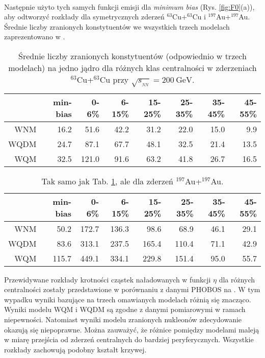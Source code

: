 \documentclass[a4paper,12pt]{article}
\begin{document}
\paragraph{}
Następnie użyto tych samych funkcji emisji dla \textit{minimum bias} (Rys. \ref{fig:F0}(a)), aby odtworzyć rozkłady dla symetrycznych zderzeń $^{63}$Cu+$^{63}$Cu i $^{197}$Au+$^{197}$Au. Średnie liczby zranionych konstytuentów we wszystkich trzech modelach zaprezentowano w .

\begin{table}[H]\centering
\begin{tabular}{|r|r|r|r|r|r|r|r|} \hline
 & min-bias & 0-6\% & 6-15\% & 15-25\% & 25-35\% & 35-45\% & 45-55\% \\ \hline
WNM  & 16.2 & 51.6 & 42.2 & 31.2 & 22.0 & 15.0 & 9.9 \\ \hline
WQDM & 24.7 & 87.1 & 67.7 & 48.1 & 32.5 & 21.4 & 13.5 \\ \hline
WQM  & 32.5 & 121.0 & 91.6 & 63.2 & 41.8 & 26.7 & 16.5 \\ \hline
\end{tabular}
\caption{Średnie liczby zranionych konstytuentów (odpowiednio w trzech modelach) na jedno jądro dla różnych klas centralności w zderzeniach $^{63}$Cu+$^{63}$Cu przy $\sqrt{s_{_{NN}}} = 200~\text{GeV}$.}\label{table:Cu-Cu}
\end{table}
\begin{table}[H]\centering
\begin{tabular}{|r|r|r|r|r|r|r|r|} \hline
 & min-bias & 0-6\% & 6-15\% & 15-25\% & 25-35\% & 35-45\% & 45-55\% \\ \hline
WNM  & 50.2 & 172.7 & 136.3 & 98.6 & 68.9 & 46.1 & 29.1 \\ \hline
WQDM & 83.6 & 313.1 & 237.5 & 165.4 & 110.4 & 71.1 & 42.9 \\ \hline
WQM  & 115.7 & 449.1 & 334.1 & 229.8 & 151.4 & 95.0 & 55.7 \\ \hline
\end{tabular}
\caption{Tak samo jak Tab. \ref{table:Cu-Cu}, ale dla zderzeń $^{197}$Au+$^{197}$Au.}\label{table:Au-Au}
\end{table}

Przewidywane rozkłady krotności cząstek naładowanych w funkcji $\eta$ dla różnych centralności zostały przedstawione w porównaniu z danymi PHOBOS \cite{Alver:2007aa, Back:2002wb} na . W tym wypadku wyniki bazujące na trzech omawianych modelach różnią się znacząco. Wyniki modelu WQM i WQDM są zgodne z danymi pomiarowymi w ramach niepewności. Natomiast wyniki modelu zranionych nukleonów zdecydowanie okazują się niepoprawne. Można zauważyć, że różnice pomiędzy modelami maleją w miarę przejścia od zderzeń centralnych do bardziej peryferycznych. Wszystkie rozkłady zachowują podobny kształt krzywej.
\end{document}
